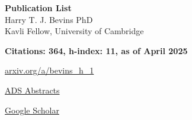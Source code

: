 \documentclass{article}
\begin{document}
%

\begin{center}
\huge
\textbf{{\color{blue}Publication List}}\\
\large{Harry T. J. Bevins PhD}\\
\large{Kavli Fellow, University of Cambridge}
\end{center}

\noindent \textbf{Citations: 364, h-index: 11, as of April 2025}

\noindent \href{http://arxiv.org/a/bevins_h_1}{arxiv.org/a/bevins\_h\_1}

\noindent \href{https://ui.adsabs.harvard.edu/search/p_=0&q=author\%3A\%22Bevins\%2C\%20H.\%20T.\%20J.\%22&sort=date\%20desc\%2C\%20bibcode\%20desc}{ADS Abstracts}

\noindent \href{https://scholar.google.com/citations?user=03_3YwQAAAAJ&hl=en}{Google Scholar}


\nocite{*}
\printbibliography[title={All Publicaitons},heading=bibintoc]
\end{document}
